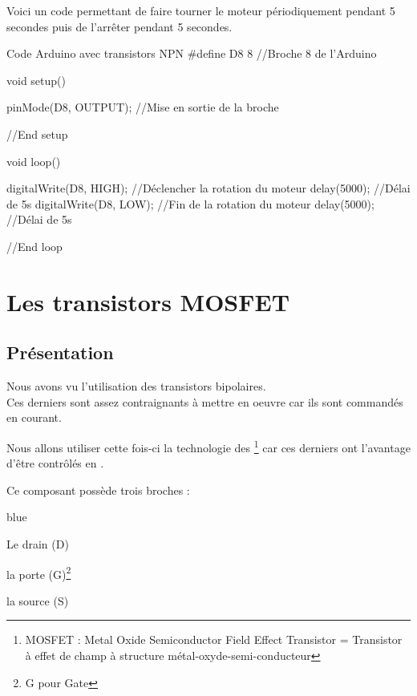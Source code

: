     Voici un code permettant de faire tourner le moteur périodiquement pendant 5 secondes puis de l'arrêter pendant 5 secondes.

\begin{Cpp}{Code Arduino avec transistors NPN}
#define D8 8     //Broche 8 de l'Arduino

void setup() {

  pinMode(D8, OUTPUT); //Mise en sortie de la broche

}//End setup

void loop() {

  digitalWrite(D8, HIGH);     //Déclencher la rotation du moteur
  delay(5000);                //Délai de 5s
  digitalWrite(D8, LOW);      //Fin de la rotation du moteur
  delay(5000);                //Délai de 5s

}//End loop

\end{Cpp}
\chapter{Les transistors MOSFET}
\section{Présentation}

     Nous avons vu l'utilisation des transistors bipolaires. \\
     Ces derniers sont assez contraignants à mettre en oeuvre car ils sont commandés en courant.

     Nous allons utiliser cette fois-ci la technologie des  \footnote{MOSFET : Metal Oxide Semiconductor Field Effect Transistor = Transistor à effet de champ à structure métal-oxyde-semi-conducteur} car ces derniers ont l'avantage d'être contrôlés en .

     Ce composant possède trois broches : 
     
     \begin{items}{blue}{\Triangle}
     
       \item Le drain (D)
       \item la porte (G)\footnote{G pour Gate}
       \item la source (S)
     
     \end{items}
     
     
